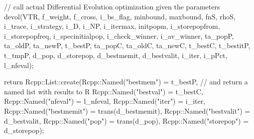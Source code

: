 \documentclass[nojss,shortnames,article]{jss}
\begin{document}
\begin{sidewaysfigure}
\begin{minipage}{0.40\linewidth}
    \normalsize 
    \tiny 
  \end{minipage}
  \begin{minipage}{0.03\linewidth}
    \phantom{XX}
  \end{minipage}
  \begin{minipage}{0.56\linewidth}
    \tiny

    \begin{CodeChunk}
      \begin{CodeInput}
  PROTECT(out_names = NEW_STRING(8));
  SET_STRING_ELT(out_names, 0, mkChar("bestmem"));
  SET_STRING_ELT(out_names, 1, mkChar("bestval"));
  SET_STRING_ELT(out_names, 2, mkChar("nfeval"));
  SET_STRING_ELT(out_names, 3, mkChar("iter"));
  SET_STRING_ELT(out_names, 4, mkChar("bestmemit"));
  SET_STRING_ELT(out_names, 5, mkChar("bestvalit"));
  SET_STRING_ELT(out_names, 6, mkChar("pop"));
  SET_STRING_ELT(out_names, 7, mkChar("storepop"));

  SET_NAMES(out, out_names);

  UNPROTECT(10);

  return out;
}
      \end{CodeInput}
    \end{CodeChunk}

    \normalsize 
    \tiny 

    \bigskip
    \phantom{XX}
    \bigskip
    \phantom{XX}
    \bigskip
    \phantom{XX}
    \bigskip


    \begin{CodeChunk}
      \begin{CodeInput}
	// call actual Differential Evolution optimization given the parameters
	devol(VTR, f_weight, f_cross, i_bs_flag, minbound, maxbound, fnS, rhoS, i_trace, i_strategy, i_D, i_NP, 
	      i_itermax, initpopm, i_storepopfrom, i_storepopfreq, i_specinitialpop, i_check_winner, i_av_winner,
	      ta_popP, ta_oldP, ta_newP, t_bestP, ta_popC, ta_oldC, ta_newC, t_bestC, t_bestitP, t_tmpP,
	      d_pop, d_storepop, d_bestmemit, d_bestvalit, i_iter, i_pPct, l_nfeval);

	return Rcpp::List::create(Rcpp::Named("bestmem")   = t_bestP,	// and return a named list with results to R
				  Rcpp::Named("bestval")   = t_bestC,
				  Rcpp::Named("nfeval")    = l_nfeval,
				  Rcpp::Named("iter")      = i_iter,
				  Rcpp::Named("bestmemit") = trans(d_bestmemit),
				  Rcpp::Named("bestvalit") = d_bestvalit,
				  Rcpp::Named("pop")       = trans(d_pop),
				  Rcpp::Named("storepop")  = d_storepop); 


\end{CodeInput}
\end{CodeChunk}
\end{minipage}
\end{sidewaysfigure}
\end{document}
